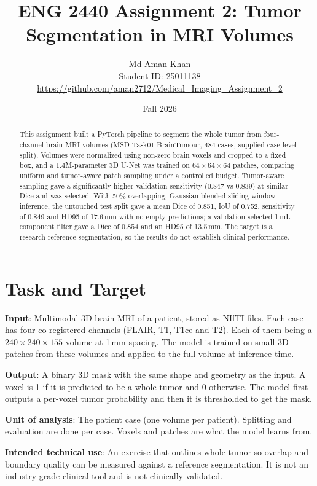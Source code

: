 \documentclass[10pt,a4paper]{article}
\title{ENG 2440 Assignment 2: Tumor Segmentation in MRI Volumes}
\author{Md Aman Khan\\Student ID: 25011138\\\url{https://github.com/aman2712/Medical_Imaging_Assignment_2}}
\date{Fall 2026}
\begin{document}
\maketitle
\vspace*{-0.2in}

\begin{abstract}
This assignment built a PyTorch pipeline to segment the whole tumor from four-channel brain MRI volumes (MSD Task01 BrainTumour, 484 cases, supplied case-level split). Volumes were normalized using non-zero brain voxels and cropped to a fixed box, and a 1.4M-parameter 3D U-Net was trained on $64\times64\times64$ patches, comparing uniform and tumor-aware patch sampling under a controlled budget. Tumor-aware sampling gave a significantly higher validation sensitivity (0.847 vs 0.839) at similar Dice and was selected. With 50\% overlapping, Gaussian-blended sliding-window inference, the untouched test split gave a mean Dice of 0.851, IoU of 0.752, sensitivity of 0.849 and HD95 of 17.6\,mm with no empty predictions; a validation-selected 1\,mL component filter gave a Dice of 0.854 and an HD95 of 13.5\,mm. The target is a research reference segmentation, so the results do not establish clinical performance.
\end{abstract}

\section{Task and Target}
\textbf{Input}: Multimodal 3D brain MRI of a patient, stored as NIfTI files. Each case has four co-registered channels (FLAIR, T1, T1ce and T2). Each of them being a $240\times240\times155$ volume at 1\,mm spacing. The model is trained on small 3D patches from these volumes and applied to the full volume at inference time.

\textbf{Output}: A binary 3D mask with the same shape and geometry as the input. A voxel is 1 if it is predicted to be a whole tumor and 0 otherwise. The model first outputs a per-voxel tumor probability and then it is thresholded to get the mask.

\textbf{Unit of analysis}: The patient case (one volume per patient). Splitting and evaluation are done per case. Voxels and patches are what the model learns from.

\textbf{Intended technical use}: An exercise that outlines whole tumor so overlap and boundary quality can be measured against a reference segmentation. It is not an industry grade clinical tool and is not clinically validated.
\end{document}
